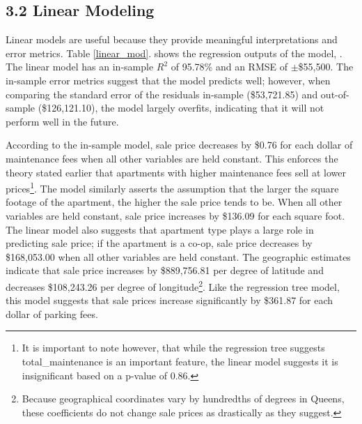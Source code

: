 \documentclass[12pt]{article}
\begin{document}
\subsection*{3.2 Linear Modeling}


Linear models are useful because they provide meaningful interpretations and error metrics. Table \ref{linear_mod}. shows the regression outputs of the model, . The linear model has an in-sample $R^2$ of 95.78\% and an RMSE of $\pm$\$55,500. The in-sample error metrics suggest that the model predicts well; however, when comparing the standard error of the residuals in-sample (\$53,721.85) and out-of-sample (\$126,121.10), the model largely overfits, indicating that it will not perform well in the future. 

According to the in-sample model, sale price decreases by \$0.76 for each dollar of maintenance fees when all other variables are held constant. This enforces the theory stated earlier that apartments with higher maintenance fees sell at lower prices\footnote{It is important to note however, that while the regression tree suggests total\_maintenance is an important feature, the linear model suggests it is insignificant based on a p-value of 0.86.}. The model similarly asserts the assumption that the larger the square footage of the apartment, the higher the sale price tends to be. When all other variables are held constant, sale price increases by \$136.09 for each square foot. The linear model also suggests that apartment type plays a large role in predicting sale price; if the apartment is a co-op, sale price decreases by \$168,053.00 when all other variables are held constant. The geographic estimates indicate that sale price increases by \$889,756.81 per degree of latitude and decreases \$108,243.26 per degree of longitude\footnote{Because geographical coordinates vary by hundredths of degrees in Queens, these coefficients do not change sale prices as drastically as they suggest.}. Like the regression tree model, this model suggests that sale prices increase significantly by \$361.87 for each dollar of parking fees.
\end{document}
